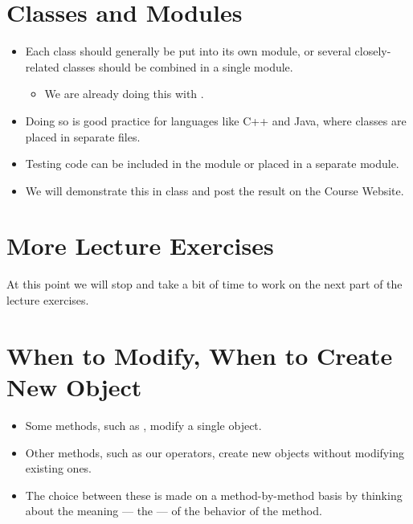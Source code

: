\documentclass[letterpaper,10pt,english]{sphinxmanual}
\begin{document}
\section{Classes and Modules}
\label{\detokenize{lecture_notes/lec18_classes1:classes-and-modules}}\begin{itemize}
\item {} 
Each class should generally be put into its own module, or several
closely-related classes should be combined in a single module.
\begin{itemize}
\item {} 
We are already doing this with .

\end{itemize}

\item {} 
Doing so is good practice for languages like C++ and Java, where
classes are placed in separate files.

\item {} 
Testing code can be included in the module or placed in a separate
module.

\item {} 
We will demonstrate this in class and post the result on the Course
Website.

\end{itemize}


\section{More Lecture Exercises}
\label{\detokenize{lecture_notes/lec18_classes1:more-lecture-exercises}}
At this point we will stop and take a bit of time to work on the next
part of the lecture exercises.


\section{When to Modify, When to Create New Object}
\label{\detokenize{lecture_notes/lec18_classes1:when-to-modify-when-to-create-new-object}}\begin{itemize}
\item {} 
Some methods, such as , modify a single  object.

\item {} 
Other methods, such as our operators, create new  objects
without modifying existing ones.

\item {} 
The choice between these is made on a method-by-method basis by
thinking about the meaning — the  — of the behavior of the
method.

\end{itemize}
\end{document}
